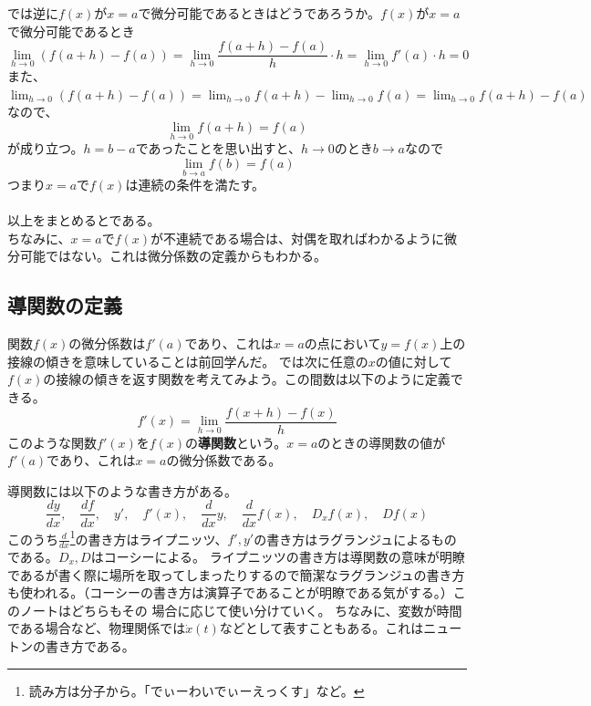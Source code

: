 \documentclass[a4j,dvipdfmx]{jsarticle}
\begin{document}
            では逆に$f(x)$が$x=a$で微分可能であるときはどうであろうか。$f(x)$が$x=a$で微分可能であるとき
            \begin{equation}
                \lim_{h\to 0}(f(a+h)-f(a))=\lim_{h\to 0}\frac{f(a+h)-f(a)}{h}\cdot h=\lim_{h\to 0}f'(a)\cdot h=0 
            \end{equation}
            また、$\displaystyle \lim_{h\to 0}(f(a+h)-f(a))=\lim_{h\to 0}f(a+h)-\lim_{h\to 0}f(a)=\lim_{h\to 0}f(a+h)-f(a)$なので、
            \begin{equation}
                \lim_{h\to 0}f(a+h)=f(a)
            \end{equation}
            が成り立つ。$h=b-a$であったことを思い出すと、$h\to 0$のとき$b\to a$なので
            \begin{equation}
                \lim_{b\to a}f(b) = f(a)
            \end{equation}
            つまり$x=a$で$f(x)$は連続の条件を満たす。\\\\
            \noindent
            以上をまとめるとである。 \\

            ちなみに、$x=a$で$f(x)$が不連続である場合は、対偶を取ればわかるように微分可能ではない。これは微分係数の定義からもわかる。
        \clearpage
        \subsection{導関数の定義}
            関数$f(x)$の微分係数は$f'(a)$であり、これは$x=a$の点において$y=f(x)$上の接線の傾きを意味していることは前回学んだ。
            では次に任意の$x$の値に対して$f(x)$の接線の傾きを返す関数を考えてみよう。この間数は以下のように定義できる。
            \begin{equation}
                f'(x)=\lim_{h\to 0}\frac{f(x+h)-f(x)}{h}
            \end{equation}
            このような関数$f'(x)$を$f(x)$の\textbf{導関数}という。$x=a$のときの導関数の値が$f'(a)$であり、これは$x=a$の微分係数である。

            導関数には以下のような書き方がある。
            \begin{equation}
                \frac{dy}{dx},\quad\frac{df}{dx},\quad y',\quad f'(x),\quad\frac{d}{dx}y,\quad\frac{d}{dx}f(x),\quad D_xf(x),\quad Df(x)
            \end{equation}
            このうち$\frac{d}{dx}$\footnote{読み方は分子から。「でぃーわいでぃーえっくす」など。}の書き方はライプニッツ、$f',y'$の書き方はラグランジュによるものである。$D_x,D$はコーシーによる。
            ライプニッツの書き方は導関数の意味が明瞭であるが書く際に場所を取ってしまったりするので簡潔なラグランジュの書き方も使われる。（コーシーの書き方は演算子であることが明瞭である気がする。）このノートはどちらもその
            場合に応じて使い分けていく。
            ちなみに、変数が時間である場合など、物理関係では$\dot{x}(t)$などとして表すこともある。これはニュートンの書き方である。\\
\end{document}
